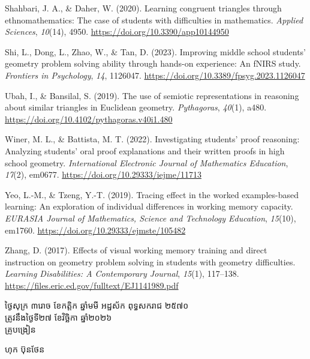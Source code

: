 \documentclass[a4paper,12pt]{article}
\begin{document}
{Shahbari, J. A., \& Daher, W. (2020). Learning congruent triangles through ethnomathematics: The case of students with difficulties in mathematics. \textit{Applied Sciences}, \textit{10}(14), 4950. \url{https://doi.org/10.3390/app10144950}

Shi, L., Dong, L., Zhao, W., \& Tan, D. (2023). Improving middle school students' geometry problem solving ability through hands-on experience: An fNIRS study. \textit{Frontiers in Psychology}, \textit{14}, 1126047. \url{https://doi.org/10.3389/fpsyg.2023.1126047}

Ubah, I., \& Bansilal, S. (2019). The use of semiotic representations in reasoning about similar triangles in Euclidean geometry. \textit{Pythagoras}, \textit{40}(1), a480. \url{https://doi.org/10.4102/pythagoras.v40i1.480}

Winer, M. L., \& Battista, M. T. (2022). Investigating students' proof reasoning: Analyzing students' oral proof explanations and their written proofs in high school geometry. \textit{International Electronic Journal of Mathematics Education}, \textit{17}(2), em0677. \url{https://doi.org/10.29333/iejme/11713}

Yeo, L.-M., \& Tzeng, Y.-T. (2019). Tracing effect in the worked examples-based learning: An exploration of individual differences in working memory capacity. \textit{EURASIA Journal of Mathematics, Science and Technology Education}, \textit{15}(10), em1760. \url{https://doi.org/10.29333/ejmste/105482}

Zhang, D. (2017). Effects of visual working memory training and direct instruction on geometry problem solving in students with geometry difficulties. \textit{Learning Disabilities: A Contemporary Journal}, \textit{15}(1), 117--138. \url{https://files.eric.ed.gov/fulltext/EJ1141989.pdf}

\par}

\needspace{2.0cm}
\vspace{6pt}
\hfill
\begin{minipage}{10.2cm}
  {\centering
    ថ្ងៃសុក្រ ៣រោច ខែកត្តិក ឆ្នាំមមី អដ្ឋស័ក ពុទ្ធសករាជ ២៥៧០\\[2pt]
    ត្រូវនឹងថ្ងៃទី២៧ ខែវិច្ឆិកា ឆ្នាំ២០២៦\\[4pt]
    {\muol\fontsize{11.5pt}{18pt}\selectfont គ្រូបង្រៀន}\par}
  \vspace{32pt}
  \hfill{\muol\fontsize{11.5pt}{18pt}\selectfont ហុក ប៊ុនថែន}\hspace*{1.4cm}
\end{minipage}
\end{document}
